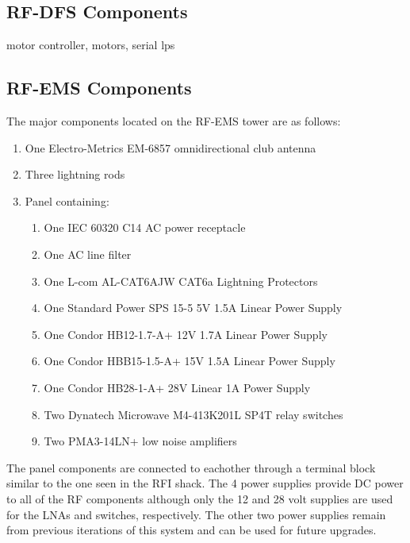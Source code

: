 \documentclass[titlepage]{article}
\begin{document}
\subsection{RF-DFS Components}\label{sec:higdfs}
motor controller, motors, serial lps

\subsection{RF-EMS Components}\label{sec:higems}
The major components located on the RF-EMS tower are as follows:
\begin{enumerate}
  \item One Electro-Metrics EM-6857 omnidirectional club antenna
  \item Three lightning rods
  \item Panel containing:
  \begin{enumerate}
    \item One IEC 60320 C14 AC power receptacle
    \item One AC line filter
    \item One L-com AL-CAT6AJW CAT6a Lightning Protectors
    \item One Standard Power SPS 15-5 5V 1.5A Linear Power Supply
    \item One Condor HB12-1.7-A+ 12V 1.7A Linear Power Supply
    \item One Condor HBB15-1.5-A+ 15V 1.5A Linear Power Supply
    \item One Condor HB28-1-A+ 28V Linear 1A Power Supply
    \item Two Dynatech Microwave M4-413K201L SP4T relay switches
    \item Two PMA3-14LN+ low noise amplifiers
  \end{enumerate}
\end{enumerate}
The panel components are connected to eachother through a terminal block similar to the one seen in the RFI shack. The 4 power supplies provide DC power to all of the RF components although only the 12 and 28 volt supplies are used for the LNAs and switches, respectively. The other two power supplies remain from previous iterations of this system and can be used for future upgrades.
\end{document}

